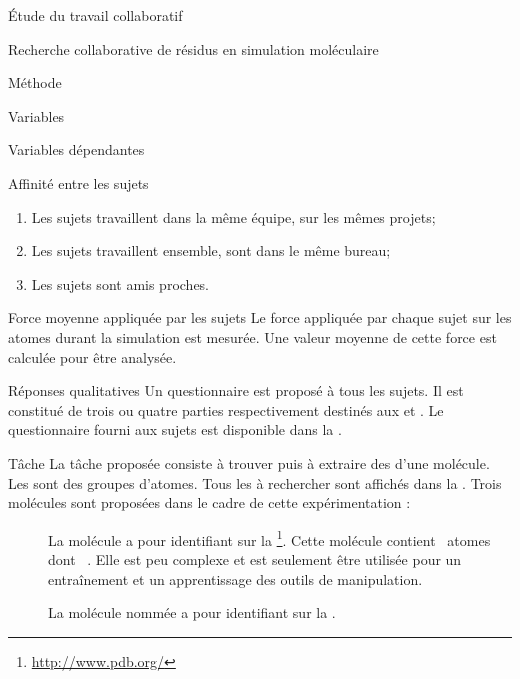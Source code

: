 \documentclass[myfrancais]{mythesis}
\begin{document}
\begin{mypart}{Étude du travail collaboratif}
\begin{mychapter}{Recherche collaborative de résidus en simulation moléculaire}
\begin{mysection}{Méthode}
\begin{mysubsection}{Variables}
\begin{mysubsubsection}{Variables dépendantes}
\begin{myparagraph}{ Affinité entre les sujets}
\begin{enumerate}
								\item Les sujets travaillent dans la même équipe, sur les mêmes projets;
								\item Les sujets travaillent ensemble, sont dans le même bureau;
								\item Les sujets sont amis proches.
							\end{enumerate}
						\end{myparagraph}
						\begin{myparagraph}{ Force moyenne appliquée par les sujets}
							Le force appliquée par chaque sujet sur les atomes durant la simulation est mesurée.
							Une valeur moyenne de cette force est calculée pour être analysée.
						\end{myparagraph}
						\begin{myparagraph}{ Réponses qualitatives}
							Un questionnaire est proposé à tous les sujets.
							Il est constitué de trois ou quatre parties respectivement destinés aux  et .
							Le questionnaire fourni aux sujets est disponible dans la .
						\end{myparagraph}
					\end{mysubsubsection}
				\end{mysubsection}
				\begin{mysubsection}[sse-exp1-Tache]{Tâche}
					La tâche proposée consiste à trouver puis à extraire des  d'une molécule.
					Les  sont des groupes d'atomes.
					Tous les  à rechercher sont affichés dans la .
					Trois molécules sont proposées dans le cadre de cette expérimentation :
					\begin{description}
						\item[\myTRPZIPPER]
							La molécule \myTRPZIPPER {} a pour identifiant \myPDB {} sur la \myPDBbase\footnote{\url{http://www.pdb.org/}}.
							Cette molécule contient ~atomes dont ~.
							Elle est peu complexe et est seulement être utilisée pour un entraînement et un apprentissage des outils de manipulation.
						\item[\myTRPCAGE]
							La molécule nommée \myTRPCAGE {} a pour identifiant \myPDB {} sur la \myPDBbase\footnotemark[\value{footnote}].

\end{description}
\end{mysubsection}
\end{mysection}
\end{mychapter}
\end{mypart}
\end{document}
